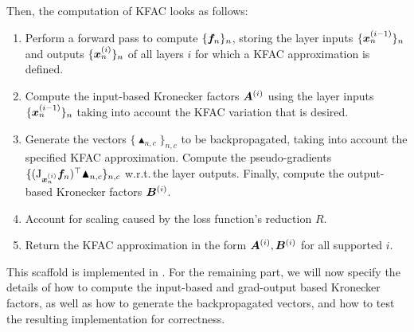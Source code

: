 Then, the computation of KFAC looks as follows:
\begin{enumerate}
\item Perform a forward pass to compute $\{{\bm{f}}_n\}_n $, storing the layer inputs $\{{\bm{x}}_n^{(i-1)} \}_n$ and outputs $\{{\bm{x}}_n^{(i)}\}_n$ of all layers $i$ for which a KFAC approximation is defined.

\item Compute the input-based Kronecker factors ${\bm{A}}^{(i)}$ using the layer inputs $\{{\bm{x}}_n^{(i-1)}\}_n$ taking into account the KFAC variation that is desired.

\item Generate the vectors $\{\blacktriangle_{n,c}\}_{n,c}$ to be backpropagated, taking into account the specified KFAC approximation. Compute the pseudo-gradients $\{(\mathrm{J}_{{\bm{x}}_n^{(i)}} {\bm{f}}_n)^{\top} \blacktriangle_{n,c} \}_{n,c}$ w.r.t.\,the layer outputs. Finally, compute the output-based Kronecker factors ${\bm{B}}^{(i)}$.

\item Account for scaling caused by the loss function's reduction $R$.

\item Return the KFAC approximation in the form ${\bm{A}}^{(i)}, {\bm{B}}^{(i)}$ for all supported $i$.
\end{enumerate}
This scaffold is implemented in .
For the remaining part, we will now specify the details of how to compute the input-based and grad-output based Kronecker factors, as well as how to generate the backpropagated vectors, and how to test the resulting implementation for correctness.
